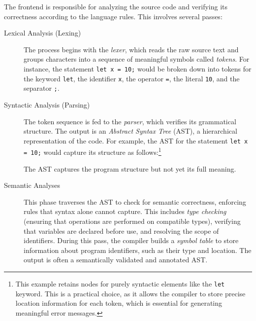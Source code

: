 The frontend is responsible for analyzing the source code and verifying its correctness
according to the language rules. This involves several passes:
\begin{description}
    \item[Lexical Analysis (Lexing)] The process begins with the \emph{lexer}, which reads the
          raw source text and groups characters into a sequence of meaningful symbols called
          \emph{tokens}. For instance, the statement \texttt{let x = 10;} would be broken down
          into tokens for the keyword \texttt{let}, the identifier \texttt{x}, the operator
          \texttt{=}, the literal \texttt{10}, and the separator \texttt{;}.

    \item[Syntactic Analysis (Parsing)] The token sequence is fed to the \emph{parser}, which
          verifies its grammatical structure. The output is an \emph{Abstract Syntax Tree} (AST),
          a hierarchical representation of the code. For example, the AST for the statement
          \texttt{let x = 10;} would capture its structure as follows:\footnote{This example retains
              nodes for purely syntactic elements like the \texttt{let} keyword. This is a practical
              choice, as it allows the compiler to store precise location information for each
              token, which is essential for generating meaningful error messages.}
          \begin{center}
          \end{center}
          The AST captures the program structure but not yet its full meaning.

    \item[Semantic Analyses] This phase traverses the AST to check for semantic correctness,
          enforcing rules that syntax alone cannot capture. This includes \emph{type checking}
          (ensuring that operations are performed on compatible types), verifying that
          variables are declared before use, and resolving the scope of identifiers. During
          this pass, the compiler builds a \emph{symbol table} to store information about
          program identifiers, such as their type and location. The output is often a
          semantically validated and annotated AST.
\end{description}

